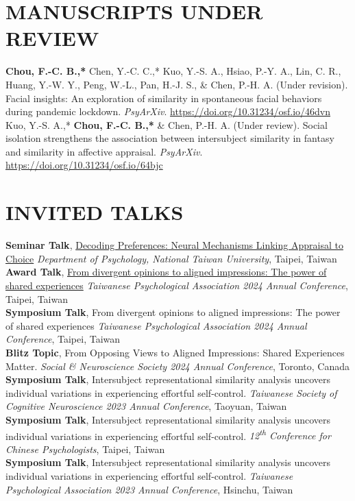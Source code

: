 \documentclass[a4paper,12pt]{article}
\newcommand{\itemspace}{7pt} %
\begin{document}
\section*{MANUSCRIPTS UNDER REVIEW}
\noindent\textbf{Chou, F.-C. B.,*} Chen, Y.-C. C.,* Kuo, Y.-S. A., Hsiao, P.-Y. A., Lin, C. R., Huang, Y.-W. Y., Peng, W.-L., Pan, H.-J. S., \& Chen, P.-H. A. (Under revision). Facial insights: An exploration of similarity in spontaneous facial behaviors during pandemic lockdown. \textit{PsyArXiv}. \href{https://doi.org/10.31234/osf.io/46dvn} {https://doi.org/10.31234/osf.io/46dvn}\\[\itemspace]
\noindent Kuo, Y.-S. A.,* \textbf{Chou, F.-C. B.,*} \& Chen, P.-H. A. (Under review). Social isolation strengthens the association between intersubject similarity in fantasy and similarity in affective appraisal. \textit{PsyArXiv}. \href{https://doi.org/10.31234/osf.io/64bjc} {https://doi.org/10.31234/osf.io/64bjc}


\section*{INVITED TALKS}
\textbf{Seminar Talk}, \href{http://www.psy.ntu.edu.tw/index.php/homepage/speech/2903-1131127}{Decoding Preferences: Neural Mechanisms Linking Appraisal to Choice} \textit{Department of Psychology, National Taiwan University}, Taipei, Taiwan \\[\itemspace]
\textbf{Award Talk}, \href{https://github.com/Ben-FCC/Ben-FCC_CV/blob/main/assets/2024_TPA_Oral.pdf}{From divergent opinions to aligned impressions: The power of shared experiences}  \textit{Taiwanese Psychological Association 2024 Annual Conference}, Taipei, Taiwan \\[\itemspace]
\textbf{Symposium Talk}, From divergent opinions to aligned impressions: The power of shared experiences  \textit{Taiwanese Psychological Association 2024 Annual Conference}, Taipei, Taiwan \\[\itemspace]
\textbf{Blitz Topic},  From Opposing Views to Aligned Impressions: Shared Experiences Matter.  \textit{Social \& Neuroscience Society 2024 Annual Conference}, Toronto, Canada \\[\itemspace]
\textbf{Symposium Talk}, Intersubject representational similarity analysis uncovers individual variations in experiencing effortful self-control. \textit{Taiwanese Society of Cognitive Neuroscience 2023 Annual Conference}, Taoyuan, Taiwan \\[\itemspace]
\textbf{Symposium Talk}, Intersubject representational similarity analysis uncovers individual variations in experiencing effortful self-control.  \textit{12\textsuperscript{th} Conference for Chinese Psychologists}, Taipei, Taiwan \\[\itemspace]
\textbf{Symposium Talk}, Intersubject representational similarity analysis uncovers individual variations in experiencing effortful self-control.  \textit{Taiwanese Psychological Association 2023 Annual Conference}, Hsinchu, Taiwan 
\end{document}
